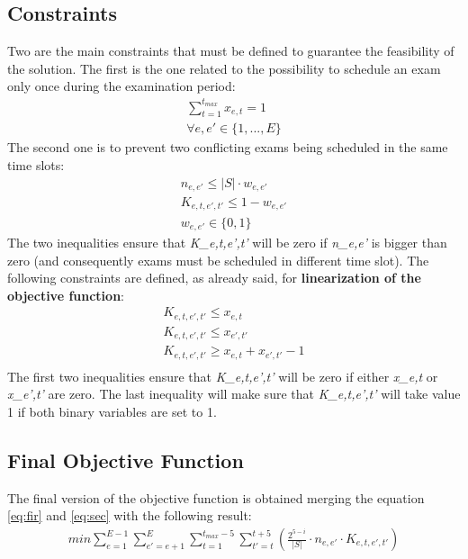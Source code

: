 \documentclass[12pt]{article}
\begin{document}
\subsection{Constraints}
Two  are the main constraints that must be defined to guarantee the feasibility of the solution. 
The first is the one related to the possibility to schedule an exam only once during the examination period:
\begin{equation}
  \begin{gathered}
     \sum_{t=1}^{t_{max}} x_{e,t} = 1\\
     \forall e, e' \in \{1,...,E\}
  \end{gathered}
\end{equation}
The second one is to prevent two conflicting exams being scheduled in the same time slots:
\begin{equation}
  \begin{gathered}
     n_{e,e'} \leq |S| \cdot w_{e,e'}\\
     K_{e,t,e',t'} \leq 1 - w_{e,e'}\\
     w_{e,e'} \in \{0,1\}
  \end{gathered}
\end{equation}
The two inequalities ensure that \textit{K_{e,t,e',t'}} will be zero if \textit{n_{e,e'}} is bigger than zero (and consequently exams must be scheduled in different time slot). 
The following constraints are defined, as already said, for \textbf{linearization of the objective function}:
\begin{equation}
  \begin{gathered}
     K_{e,t,e',t'} \leq x_{e,t}\\
     K_{e,t,e',t'} \leq x_{e',t'}\\
     K_{e,t,e',t'} \geq x_{e,t} + x_{e',t'} - 1\\
     \label{eq:linearize}
  \end{gathered}
\end{equation}
The first two inequalities ensure that \textit{K_{e,t,e',t'}} will be zero if either \textit{x_{e,t}} or \textit{x_{e',t'}} are zero. The last inequality will make sure that \textit{K_{e,t,e',t'}} will take value 1 if both binary variables are set to 1.

\subsection{Final Objective Function}
The final version of the objective function is obtained merging the equation \ref{eq:fir} and \ref{eq:sec} with the following result:
\begin{equation}
  \begin{gathered}
    min\sum_{e=1}^{E-1}\sum_{e'=e+1}^{E}\sum_{t=1}^{t_{max}-5}\sum_{t'=t}^{t+5} (\frac{2^{5-i}}{|S|} \cdot n_{e,e'} \cdot K_{e,t,e',t'})
    \label{eq:final}
  \end{gathered}
\end{equation}
\end{document}
